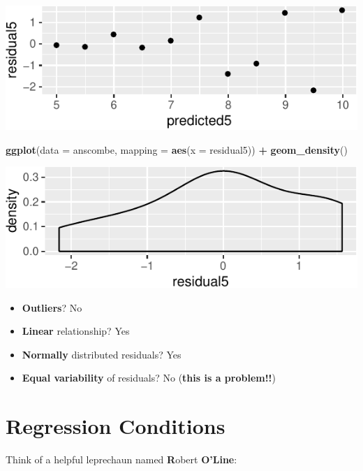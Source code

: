 \documentclass[14pt]{extarticle}
\newenvironment{Shaded}{\begin{snugshade}}{\end{snugshade}}
\newcommand{\KeywordTok}[1]{\textcolor[rgb]{0.13,0.29,0.53}{\textbf{#1}}}
\newcommand{\DataTypeTok}[1]{\textcolor[rgb]{0.13,0.29,0.53}{#1}}
\newcommand{\StringTok}[1]{\textcolor[rgb]{0.31,0.60,0.02}{#1}}
\newcommand{\OperatorTok}[1]{\textcolor[rgb]{0.81,0.36,0.00}{\textbf{#1}}}
\newcommand{\NormalTok}[1]{#1}
\begin{document}
\includegraphics{20181112_anscombe_residuals_files/figure-latex/unnamed-chunk-16-1.pdf}

\begin{Shaded}
\begin{Highlighting}[]
\KeywordTok{ggplot}\NormalTok{(}\DataTypeTok{data =}\NormalTok{ anscombe, }\DataTypeTok{mapping =} \KeywordTok{aes}\NormalTok{(}\DataTypeTok{x =}\NormalTok{ residual5)) }\OperatorTok{+}\StringTok{ }\KeywordTok{geom_density}\NormalTok{()}
\end{Highlighting}
\end{Shaded}

\includegraphics{20181112_anscombe_residuals_files/figure-latex/unnamed-chunk-17-1.pdf}

\begin{itemize}
\item
  \textbf{Outliers}? No
\item
  \textbf{Linear} relationship? Yes
\item
  \textbf{Normally} distributed residuals? Yes
\item
  \textbf{Equal variability} of residuals? No (\textbf{this is a
  problem!!})
\end{itemize}

\newpage

\section{Regression Conditions}\label{regression-conditions}

Think of a helpful leprechaun named \textbf{R}obert \textbf{O'Line}:
\end{document}
